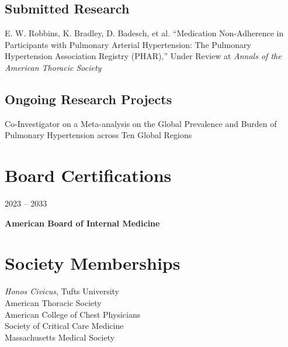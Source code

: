 \documentclass{article}
\newcommand\colleft{.20}
\newcommand\colright{.75}
\newcommand{\entryfour}[4]
	{
		\begin{minipage}[t]{\colleft\textwidth}
		\hfill \textsc{#1}
		\end{minipage}
		\hfill\vline\hfill
		\begin{minipage}[t]{\colright\textwidth}
		{\bf#2}\\
		\textit{#3}
		\footnotesize{#4}
		\end{minipage}\\
		\entryvspace
	}%
\newcommand{\entrytwo}[2]
{
	\begin{minipage}[t]{\colleft\textwidth}
		\hfill \textsc{#1}
	\end{minipage}
	\hfill\vline\hfill
	\begin{minipage}[t]{\colright\textwidth}
		{\bf#2}
	\end{minipage}
	\entryvspace
}%
\newcommand{\entryvspace}{\vspace{0.5em}}
\begin{document}
	\subsection*{Submitted Research}
		E. W. Robbins, K. Bradley, D. Badesch, et al. ``Medication Non-Adherence in Participants with Pulmonary Arterial Hypertension: The Pulmonary Hypertension Association Registry (PHAR),'' Under Review at \emph{Annals of the American Thoracic Society}
	\subsection*{Ongoing Research Projects}
		Co-Investigator on a Meta-analysis on the Global Prevalence and Burden of Pulmonary Hypertension across Ten Global Regions
	
	
	\section*{Board Certifications}
		\entrytwo{2023 -- 2033}{American Board of Internal Medicine}
	\section*{Society Memberships}
		\emph{Honos Civicus}, Tufts University\\
		American Thoracic Society\\
		American College of Chest Physicians\\
		Society of Critical Care Medicine\\
		Massachusetts Medical Society
		
\end{document}
